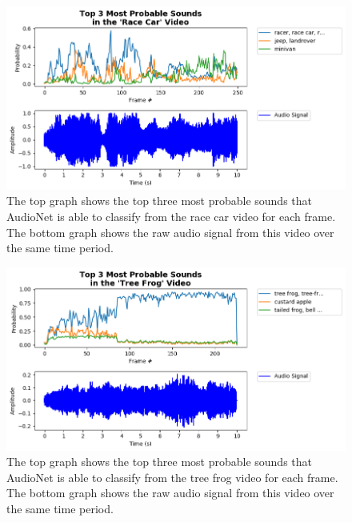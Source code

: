 \documentclass[12pt,twoside]{article}
\theoremstyle{plain}
\theoremstyle{definition}
\theoremstyle{remark}
\begin{document}
\begin{figure}[h]
   \centerline{\includegraphics[width=\textwidth]{inf_race_car.png}}
   {\caption{\footnotesize The top graph shows the top three most probable sounds that AudioNet is able to classify from the race car video for each frame.
             The bottom graph shows the raw audio signal from this video over the same time period.}
     \label{fig:inf_race_car}}
\end{figure}

\begin{figure}[h]
   \centerline{\includegraphics[width=\textwidth]{inf_tree_frog.png}}
   {\caption{\footnotesize The top graph shows the top three most probable sounds that AudioNet is able to classify from the tree frog video for each frame.
             The bottom graph shows the raw audio signal from this video over the same time period.}
     \label{fig:inf_tree_frog}}
\end{figure}
\end{document}
